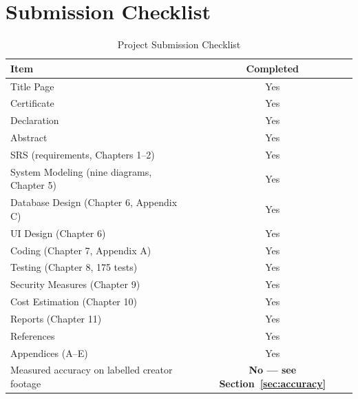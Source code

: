 \documentclass[
12pt,
a4paper,
oneside
]{report}
\begin{document}
\chapter*{Submission Checklist}

\begin{table}[H]
\centering
\begin{tabular}{|p{10cm}|c|}
\hline
\textbf{Item} & \textbf{Completed} \\
\hline
Title Page & Yes \\
\hline
Certificate & Yes \\
\hline
Declaration & Yes \\
\hline
Abstract & Yes \\
\hline
SRS (requirements, Chapters 1--2) & Yes \\
\hline
System Modeling (nine diagrams, Chapter 5) & Yes \\
\hline
Database Design (Chapter 6, Appendix C) & Yes \\
\hline
UI Design (Chapter 6) & Yes \\
\hline
Coding (Chapter 7, Appendix A) & Yes \\
\hline
Testing (Chapter 8, 175 tests) & Yes \\
\hline
Security Measures (Chapter 9) & Yes \\
\hline
Cost Estimation (Chapter 10) & Yes \\
\hline
Reports (Chapter 11) & Yes \\
\hline
References & Yes \\
\hline
Appendices (A--E) & Yes \\
\hline
Measured accuracy on labelled creator footage & \textbf{No --- see
Section~\ref{sec:accuracy}} \\
\hline
\end{tabular}
\caption{Project Submission Checklist}
\end{table}

\end{document}
